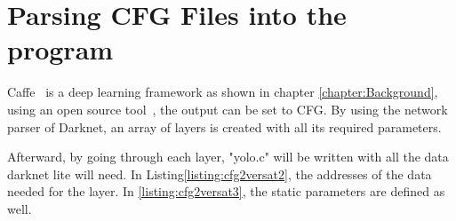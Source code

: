 



\section{Parsing CFG Files into the program}

Caffe~\cite{caffe} is a deep learning framework as shown in chapter \ref{chapter:Background}, using an open source tool~\cite{caffe2darknet}, the output can be set to CFG.
By using the network parser of Darknet, an array of layers is created with all its required parameters. 



Afterward, by going through each layer, "yolo.c" will be written with all the data darknet lite will need. 
In Listing\ref{listing:cfg2versat2}, the addresses of the data needed for the layer. 
In \ref{listing:cfg2versat3}, the static parameters are defined as well.




